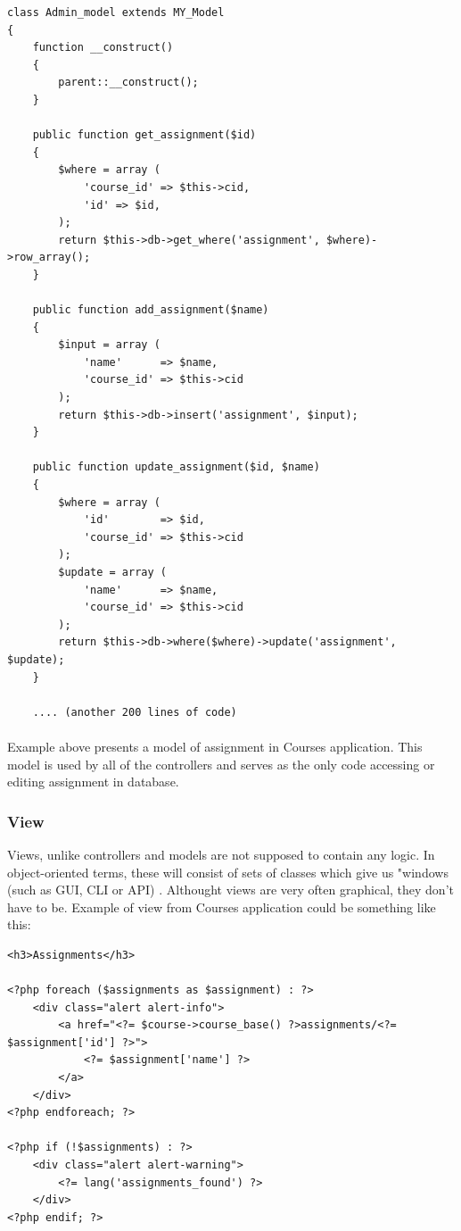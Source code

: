 \begin{lstlisting}
class Admin_model extends MY_Model
{
    function __construct()
    {
        parent::__construct();
    }

    public function get_assignment($id)
    {
        $where = array (
            'course_id' => $this->cid,
            'id' => $id,
        );
        return $this->db->get_where('assignment', $where)->row_array();
    }

    public function add_assignment($name)
    {
        $input = array (
            'name'      => $name,
            'course_id' => $this->cid
        );
        return $this->db->insert('assignment', $input);
    }

    public function update_assignment($id, $name)
    {
        $where = array (
            'id'        => $id,
            'course_id' => $this->cid
        );
        $update = array (
            'name'      => $name,
            'course_id' => $this->cid
        );
        return $this->db->where($where)->update('assignment', $update);
    }
    
    .... (another 200 lines of code)
\end{lstlisting}

\paragraph{}
Example above presents a model of assignment in Courses application. This model is used by all of the controllers and serves as the only code accessing or editing assignment in database.

\subsubsection{View}
Views, unlike controllers and models are not supposed to contain any logic. In object-oriented terms, these will consist of sets of classes which give us "windows (such as GUI, CLI or API) \cite{mvc}. Althought views are very often graphical, they don't have to be. Example of view from Courses application could be something like this:

\begin{lstlisting}
<h3>Assignments</h3>

<?php foreach ($assignments as $assignment) : ?>
    <div class="alert alert-info">
        <a href="<?= $course->course_base() ?>assignments/<?= $assignment['id'] ?>">
            <?= $assignment['name'] ?>
        </a>
    </div>
<?php endforeach; ?>

<?php if (!$assignments) : ?>
    <div class="alert alert-warning">
        <?= lang('assignments_found') ?>
    </div>
<?php endif; ?>
\end{lstlisting}


